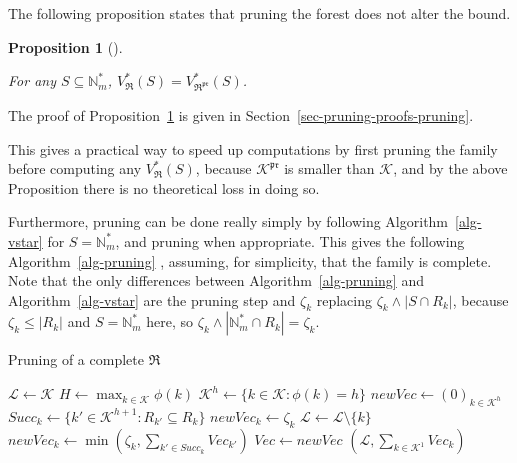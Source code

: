 \documentclass[
  11pt,
  a4paper,
]{article}
\theoremstyle{definition}
\theoremstyle{plain}
\theoremstyle{plain}
\theoremstyle{plain}
\newtheorem{proposition}{Proposition}[section]
\theoremstyle{definition}
\theoremstyle{remark}
\begin{document}
The following proposition states that pruning the forest does not alter
the bound.

\begin{proposition}[]\protect\hypertarget{prp-pruning}{}\label{prp-pruning}

For any \(S\subseteq \mathbb{N}_m^*\),
\(V^*_{\mathfrak{R}}(S)=V^*_{\mathfrak{R}^{\mathfrak{pr}}}(S)\).

\end{proposition}

The proof of Proposition~\ref{prp-pruning} is given in
Section~\ref{sec-pruning-proofs-pruning}.

This gives a practical way to speed up computations by first pruning the
family before computing any \(V^*_{\mathfrak{R}}(S)\), because
\(\mathcal{K}^{\mathfrak{pr}}\) is smaller than \(\mathcal{K}\), and by
the above Proposition there is no theoretical loss in doing so.

Furthermore, pruning can be done really simply by following
 Algorithm~\ref{alg-vstar}  for \(S=\mathbb{N}_m^*\), and pruning when
appropriate. This gives the following  Algorithm~\ref{alg-pruning} ,
assuming, for simplicity, that the family is complete. Note that the
only differences between  Algorithm~\ref{alg-pruning}  and
 Algorithm~\ref{alg-vstar}  are the pruning step and \(\zeta_k\)
replacing \(\zeta_k\wedge|S\cap R_k|\), because \(\zeta_k\leq|R_k|\) and
\(S=\mathbb{N}_m^*\) here, so
\(\zeta_k\wedge|\mathbb{N}_m^*\cap R_k|=\zeta_k\).

\begin{algorithm}[htb!]
\caption{Pruning of a complete $\mathfrak{R}$}
\label{alg-pruning}
\begin{algorithmic}[1]
  \State $\mathcal{L}\gets\mathcal{K}$
  \State $ H \gets \max_{k\in\mathcal{K}} \phi(k)  $ 
    \State $\mathcal{K}^h\gets \{ k\in\mathcal{K} : \phi(k) =h  \}$
    \State $newVec\gets (0)_{k \in  \mathcal{K}^h}$
      \State $Succ_k \gets \{ k' \in  \mathcal{K}^{h+1} : R_{k'}\subseteq R_k\}$
        \State $newVec_k \gets \zeta_k$
      \Else
          \State $\mathcal{L}\gets \mathcal{L}\setminus \{ k \}$ 
        \EndIf
        \State $newVec_k \gets \min\left( \zeta_{k} ,  \sum_{k'\in Succ_k} Vec_{k'}   \right)$
      \EndIf
    \EndFor
    \State $Vec\gets newVec$
  \EndFor
  \State\Return $(\mathcal{L},\sum_{k\in\mathcal{K}^1} Vec_k  )$
\EndProcedure
\end{algorithmic}
\end{algorithm}
\end{document}
